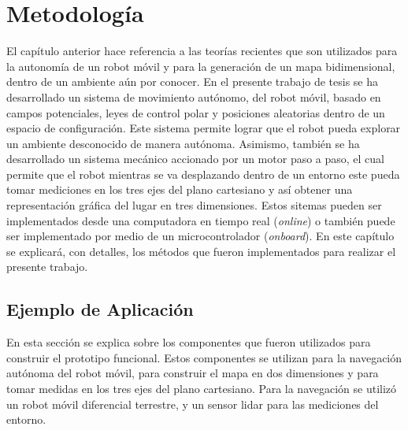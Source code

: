\chapter{Metodolog\'ia}

El capítulo anterior hace referencia a las teorías recientes que son
utilizados para la autonomía de un robot móvil y para la generación de
un mapa bidimensional, dentro de un ambiente aún por conocer. En el presente
trabajo de tesis se ha desarrollado un sistema de movimiento 
autónomo, del robot móvil, basado en campos potenciales, leyes de control 
polar y posiciones aleatorias dentro de un espacio de configuración. Este sistema
permite lograr que el robot pueda explorar un ambiente desconocido de manera
autónoma. Asimismo, también se ha desarrollado un sistema mecánico accionado 
por un motor paso a paso, el cual permite que el robot mientras se va desplazando
dentro de un entorno este pueda tomar mediciones en los tres ejes del plano
cartesiano y así obtener una representación gráfica del lugar en tres 
dimensiones. Estos sitemas pueden ser implementados desde una computadora en 
tiempo real (\textit{online}) o también puede ser implementado por medio de 
un microcontrolador (\textit{onboard}). En este capítulo se explicará, con 
detalles, los métodos que fueron implementados para realizar el presente trabajo.


\section{Ejemplo de Aplicación}
En esta sección se explica sobre los componentes que fueron utilizados para construir
el prototipo funcional. Estos componentes se utilizan para la navegación 
autónoma del robot móvil, para construir el mapa en dos dimensiones y para tomar medidas 
en los tres ejes del plano cartesiano. Para la navegación se utilizó un robot móvil 
diferencial terrestre, y un sensor lidar para las mediciones del entorno.

